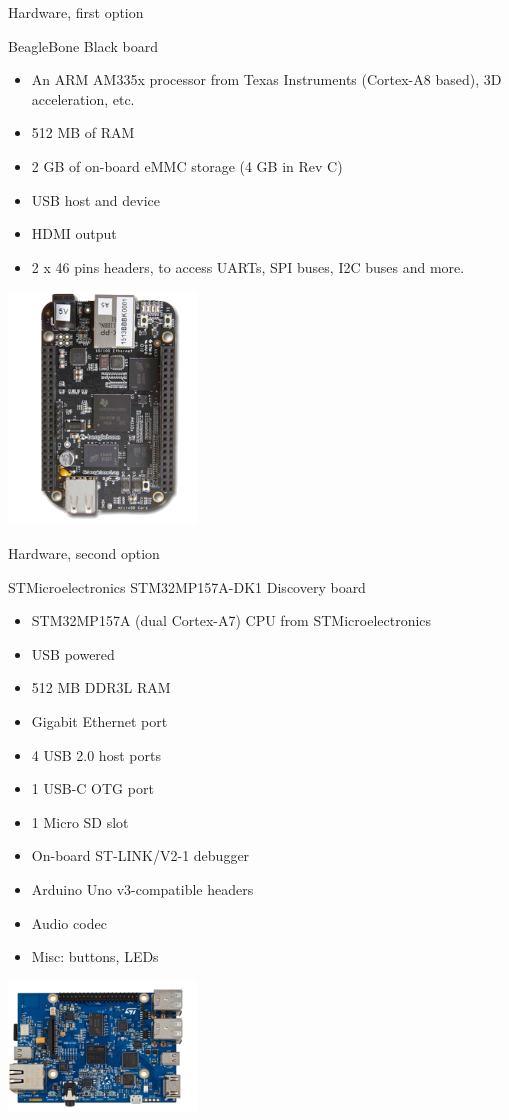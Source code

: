 \documentclass[a4paper,12pt,obeyspaces,spaces,hyphens]{article}
\begin{document}
\feagendatwocolumn
{Hardware, first option}
{
  BeagleBone Black board
  \begin{itemize}
  \item An ARM AM335x processor from Texas Instruments (Cortex-A8
    based), 3D acceleration, etc.
  \item 512 MB of RAM
  \item 2 GB of on-board eMMC storage
        \newline(4 GB in Rev C)
  \item USB host and device
  \item HDMI output
  \item 2 x 46 pins headers, to access UARTs, SPI buses, I2C buses
    and more.
  \end{itemize}
  \includegraphics[width=5cm]{../slides/beagleboneblack-board/beagleboneblack.png}
}
{Hardware, second option}
{
  STMicroelectronics STM32MP157A-DK1 Discovery board
  \begin{itemize}
  \item STM32MP157A (dual Cortex-A7) CPU from STMicroelectronics
  \item USB powered
  \item 512 MB DDR3L RAM
  \item Gigabit Ethernet port
  \item 4 USB 2.0 host ports
  \item 1 USB-C OTG port
  \item 1 Micro SD slot
  \item On-board ST-LINK/V2-1 debugger
  \item Arduino Uno v3-compatible headers
  \item Audio codec
  \item Misc: buttons, LEDs
  \end{itemize}
  \includegraphics[width=5cm]{../slides/discovery-board-dk1/discovery-board-dk1.png}
}
\end{document}
